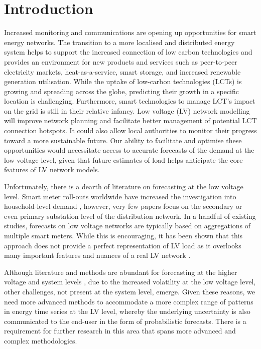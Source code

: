 \section{Introduction}
Increased monitoring and communications are opening up opportunities for smart energy networks. The transition to a more localised and distributed energy system helps to support the increased connection of low carbon technologies and provides an environment for new products and services such as peer-to-peer electricity markets, heat-as-a-service, smart storage, and increased renewable generation utilisation. While the uptake of low-carbon technologies (LCTs) is growing and spreading across the globe, predicting their growth in a specific location is challenging. Furthermore, smart technologies to manage LCT's impact on the grid is still in their relative infancy. Low voltage (LV) network modelling will improve network planning and facilitate better management of potential LCT connection hotspots. It could also allow local authorities to monitor their progress toward a more sustainable future. Our ability to facilitate and optimise these opportunities would necessitate access to accurate forecasts of the demand at the low voltage level, given that future estimates of load helps anticipate the core features of LV network models. 

Unfortunately, there is a dearth of literature on forecasting at the low voltage level. Smart meter roll-outs worldwide have increased the investigation into household-level demand \cite{Wang2018ros}, however, very few papers focus on the secondary or even primary substation level of the distribution network. In a handful of existing studies, forecasts on low voltage networks are typically based on aggregations of multiple smart meters. While this is encouraging, it has been shown that this approach does not provide a perfect representation of LV load as it overlooks many important features and nuances of a real LV network \cite{Haben2019stl}.

Although literature and methods are abundant for forecasting at the higher voltage and system levels \cite{Tao2020efa}, due to the increased volatility at the low voltage level, other challenges, not present at the system level, emerge.
Given these reasons, we need more advanced methods to accommodate a more complex range of patterns in energy time series at the LV level, whereby the underlying uncertainty is also communicated to the end-user in the form of probabilistic forecasts. There is a requirement for further research in this area that spans more advanced and complex methodologies. 

